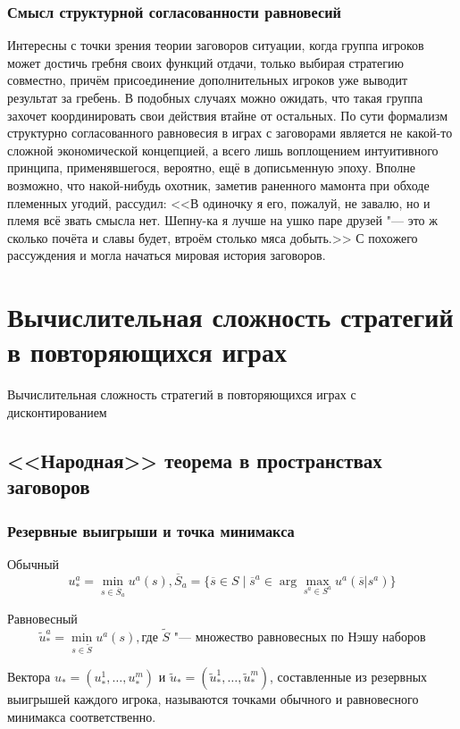 \begin{frame}
	\frametitle{Смысл структурной согласованности равновесий}
	Интересны с точки зрения теории заговоров ситуации, когда группа игроков может достичь гребня своих функций отдачи, только выбирая стратегию совместно, причём присоединение дополнительных игроков уже выводит результат за гребень. В подобных случаях можно ожидать, что такая группа захочет координировать свои действия втайне от остальных. По сути формализм структурно согласованного равновесия в играх с заговорами является не какой-то сложной экономической концепцией, а всего лишь воплощением интуитивного принципа, применявшегося, вероятно, ещё в дописьменную эпоху. Вполне возможно, что накой-нибудь охотник, заметив раненного мамонта при обходе племенных угодий, рассудил: <<В одиночку я его, пожалуй, не завалю, но и племя всё звать смысла нет. Шепну-ка я лучше на ушко паре друзей "--- это ж сколько почёта и славы будет, втроём столько мяса добыть.>> С похожего рассуждения и могла начаться мировая история заговоров.
\end{frame}

\section{Вычислительная сложность стратегий в повторяющихся играх}
\begin{frame}
    \begin{center}
        \Huge
        Вычислительная сложность стратегий в повторяющихся играх с дисконтированием
    \end{center}
\end{frame}

\subsection{<<Народная>> теорема в пространствах заговоров}

\begin{frame}
	\frametitle{Резервные выигрыши и точка минимакса}
	\begin{block}{Обычный}
		\begin{equation*}
			u^a_* = \min_{s \in \overline{S}_a} u^a(s), \overline{S}_a = \{\overline{s} \in S \mid \overline{s}^a \in \arg\max_{s^a \in S^a} u^a(\overline{s} | s^a)\}
		\end{equation*}
	\end{block}
	\begin{block}{Равновесный}
		\begin{equation*}
			\tilde{u}^a_* = \min_{s \in \tilde{S}} u^a(s), \text{где $\tilde{S}$ "--- множество равновесных по Нэшу наборов}
		\end{equation*}
	\end{block}
	Вектора $u_* = (u^1_*, \ldots, u^m_*)$ и $\tilde{u}_* = (\tilde{u}^1_*, \ldots, \tilde{u}^m_*)$, составленные из резервных выигрышей каждого игрока, называются точками обычного и равновесного минимакса соответственно.
\end{frame}

